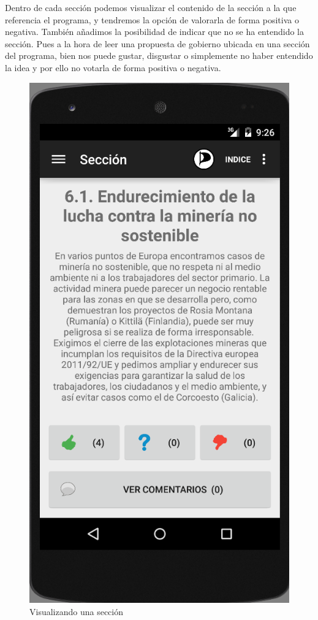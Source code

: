 Dentro de cada sección podemos visualizar el contenido de la sección a la que referencia el programa, y tendremos la opción de valorarla de forma positiva o negativa. También añadimos la posibilidad de indicar que no se ha entendido la sección. Pues a la hora de leer una propuesta de gobierno ubicada en una sección del programa, bien nos puede gustar, disgustar o simplemente no haber entendido la idea y por ello no votarla de forma positiva o negativa.

\begin{figure}[H]
\centering
\includegraphics[keepaspectratio, scale=0.5]{Media/Captures/section.png}
\caption{Visualizando una sección}
\label{fig:captSection}
\end{figure}

